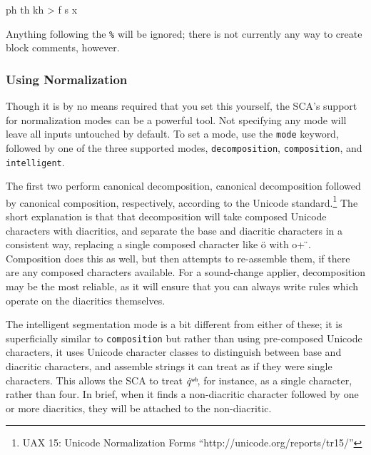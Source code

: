 \documentclass[10pt,letterpaper]{article}
\newcounter{excounter}
\newenvironment{vex}[1]{
	\vspace{1em}
	\refstepcounter{excounter}
	\noindent\makebox[3em][l]{[\arabic{excounter}\label{#1}]}
	\minipage{\textwidth}
	\verbatim
}{
	\endverbatim
	\endminipage
	\vspace{1em}
}
\begin{document}
\begin{vex}{ex:comment}
ph th kh > f s x %
\end{vex}

\noindent
Anything following the \texttt{\%} will be ignored; there is not currently any way to create block comments, however. 


\subsubsection{Using Normalization} 
\label{ssub:using_normalization}
Though it is by no means required that you set this yourself, the SCA's support for normalization modes can be a powerful tool. Not specifying any mode will leave all inputs untouched by default. To set a mode, use the \texttt{mode} keyword, followed by one of the three supported modes, \texttt{decomposition}, \texttt{composition}, and \texttt{intelligent}.

The first two perform canonical decomposition, canonical decomposition followed by canonical composition, respectively, according to the Unicode standard.\footnote{UAX 15: Unicode Normalization Forms ``http://unicode.org/reports/tr15/''} The short explanation is that that decomposition will take composed Unicode characters with diacritics, and separate the base and diacritic characters in a consistent way, replacing a single composed character like ö with o+ ̈. Composition does this as well, but then attempts to re-assemble them, if there are any composed characters available. For a sound-change applier, decomposition may be the most reliable, as it will ensure that you can always write rules which operate on the diacritics themselves.


The intelligent segmentation mode is a bit different from either of these; it is superficially similar to \texttt{composition} but rather than using pre-composed Unicode characters, it uses Unicode character classes to distinguish between base and diacritic characters, and assemble strings it can treat as if they were single characters. This allows the SCA to treat \emph{q̇ʷʰ}, for instance, as a single character, rather than four. In brief, when it finds a non-diacritic character followed by one or more diacritics, they will be attached to the non-diacritic.
\end{document}

